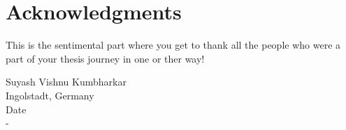 \chapter*{Acknowledgments}
This is the sentimental part where you get to thank all the people who were a part of your thesis journey in one or ther way!

\vspace{2 cm}

\begin{flushright}
Suyash Vishnu Kumbharkar\\Ingolstadt, Germany\\
Date\\
-
\end{flushright}
